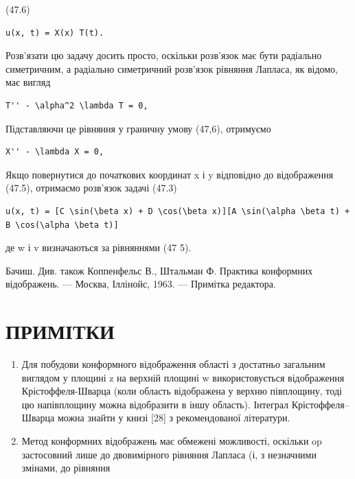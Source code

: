 \documentclass[
  ukrainian,
]{article}
\begin{document}
(47.6)

\begin{verbatim}
u(x, t) = X(x) T(t).
\end{verbatim}

Розв'язати цю задачу досить просто, оскільки розв'язок має бути
радіально симетричним, а радіально симетричний розв'язок рівняння
Лапласа, як відомо, має вигляд

\begin{verbatim}
T'' - \alpha^2 \lambda T = 0,
\end{verbatim}

Підставляючи це рівняння у граничну умову (47,6), отримуємо

\begin{verbatim}
X'' - \lambda X = 0,
\end{verbatim}

Якщо повернутися до початкових координат x і y відповідно до
відображення (47.5), отримаємо розв'язок задачі (47.3)

\begin{verbatim}
u(x, t) = [C \sin(\beta x) + D \cos(\beta x)][A \sin(\alpha \beta t) + B \cos(\alpha \beta t)]
\end{verbatim}

де w і v визначаються за рівняннями (47 5).

Бачиш. Див. також Коппенфельс В., Штальман Ф. Практика конформних
відображень. --- Москва, Іллінойс, 1963. --- Примітка редактора.

\section{ПРИМІТКИ}\label{ux43fux440ux438ux43cux456ux442ux43aux438}

\begin{enumerate}
\def\labelenumi{\arabic{enumi}.}
\item
  Для побудови конформного відображення області з достатньо загальним
  виглядом у площині z на верхній площині w використовується
  відображення Крістоффеля-Шварца (коли область відображена у верхню
  півплощину, тоді цю напівплощину можна відобразити в іншу область).
  Інтеграл Крістоффеля--Шварца можна знайти у книзі {[}28{]} з
  рекомендованої літератури.
\item
  Метод конформних відображень має обмежені можливості, оскільки op
  застосовний лише до двовимірного рівняння Лапласа (і, з незначними
  змінами, до рівняння
\end{enumerate}
\end{document}
